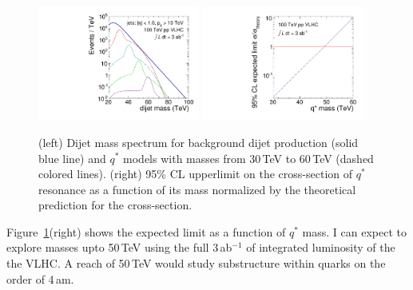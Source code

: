 \begin{figure}
\begin{center}
\includegraphics[width=0.475\textwidth]{QstarVLHC/plots/qstar_100TeV}
\includegraphics[width=0.475\textwidth]{QstarVLHC/plots/qstar_limits}
\end{center}
\caption{\label{fig:qstar_vlhc}(left) Dijet mass spectrum for
  background dijet production (solid blue line) and $q^*$ models with
  masses from 30\,TeV to 60\,TeV (dashed colored lines). (right) 95\%
  CL upperlimit on the cross-section of $q^*$ resonance as a function
  of its mass normalized by the theoretical prediction for the
  cross-section.}
\end{figure}

Figure~\ref{fig:qstar_vlhc}(right) shows the expected limit as a
function of $q^*$ mass.  I can expect to explore masses upto 50\,TeV
using the full 3\,ab$^{-1}$ of integrated luminosity of the the VLHC.
A reach of 50\,TeV would study substructure within quarks on the order
of 4\,am.

